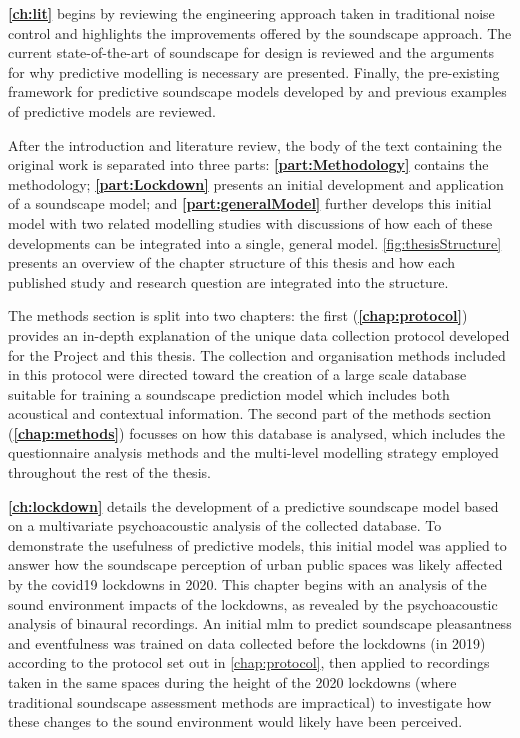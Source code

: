\textbf{\cref{ch:lit}} begins by reviewing the engineering approach taken in traditional noise control and highlights the improvements offered by the soundscape approach. The current state-of-the-art of soundscape for design is reviewed and the arguments for why predictive modelling is necessary are presented. Finally, the pre-existing framework for predictive soundscape models developed by \citet{Aletta2016Soundscape} and previous examples of predictive models are reviewed. 

After the introduction and literature review, the body of the text containing the original work is separated into three parts: \textbf{\cref{part:Methodology}} contains the methodology; \textbf{\cref{part:Lockdown}} presents an initial development and application of a soundscape model; and \textbf{\cref{part:generalModel}} further develops this initial model with two related modelling studies with discussions of how each of these developments can be integrated into a single, general model. \cref{fig:thesisStructure} presents an overview of the chapter structure of this thesis and how each published study and research question are integrated into the structure.

The methods section is split into two chapters: the first (\textbf{\cref{chap:protocol}}) provides an in-depth explanation of the unique data collection protocol developed for the  Project and this thesis. The collection and organisation methods included in this protocol were directed toward the creation of a large scale database suitable for training a soundscape prediction model which includes both acoustical and contextual information. The second part of the methods section (\textbf{\cref{chap:methods}}) focusses on how this database is analysed, which includes the questionnaire analysis methods and the multi-level modelling strategy employed throughout the rest of the thesis.

\textbf{\cref{ch:lockdown}} details the development of a predictive soundscape model based on a multivariate psychoacoustic analysis of the collected database. To demonstrate the usefulness of predictive models, this initial model was applied to answer how the soundscape perception of urban public spaces was likely affected by the \gls{covid19} lockdowns in 2020. This chapter begins with an analysis of the sound environment impacts of the lockdowns, as revealed by the psychoacoustic analysis of binaural recordings. An initial \gls{mlm} to predict soundscape pleasantness and eventfulness was trained on data collected before the lockdowns (in 2019) according to the protocol set out in \cref{chap:protocol}, then applied to recordings taken in the same spaces during the height of the 2020 lockdowns (where traditional soundscape assessment methods are impractical) to investigate how these changes to the sound environment would likely have been perceived. 

